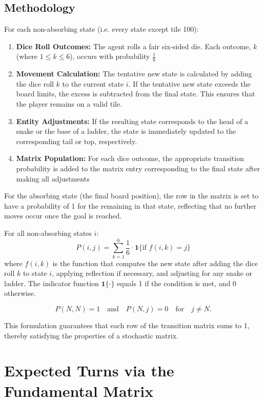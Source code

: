 \subsection{Methodology}
For each non-absorbing state (i.e. every state except tile 100):
\begin{enumerate}
	\item \textbf{Dice Roll Outcomes:} The agent rolls a fair six-sided die. Each outcome, $k$ (where $1 \leq k \leq 6$), occurs with probability $\frac{1}{6}$
	\item \textbf{Movement Calculation:} The tentative new state is calculated by adding the dice roll $k$ to the current state $i$. If the tentative new state exceeds the board limits, the excess is subtracted from the final state. This ensures that the player remains on a valid tile.
	\item \textbf{Entity Adjustments:} If the resulting state corresponds to the head of a snake or the base of a ladder, the state is immediately updated to the corresponding tail or top, respectively. 
	\item \textbf{Matrix Population:} For each dice outcome, the appropriate transition probability is added to the matrix entry corresponding to the final state after making all adjustments
\end{enumerate}

For the absorbing state (the final board position), the row in the matrix is set to have a probability of 1 for the remaining in that state, reflecting that no further moves occur once the goal is reached.

For all non-absorbing states $i$:
\[
P(i, j) = \sum_{k=1}^{6} \frac{1}{6} \cdot \mathbf{1}\{\text{if } f(i,k) = j \}
\]
where $f(i,k)$ is the function that computes the new state after adding the dice roll $k$ to state $i$, applying reflection if necessary, and adjusting for any snake or ladder. The indicator function $\mathbf{1}\{\cdot\}$ equals 1 if the condition is met, and 0 otherwise.

\[
P(N, N) = 1 \quad \text{and} \quad P(N, j) = 0 \quad \text{for} \quad j \neq N.
\]

This formulation guarantees that each row of the transition matrix sums to 1, thereby satisfying the properties of a stochastic matrix.

\section{Expected Turns via the Fundamental Matrix}

